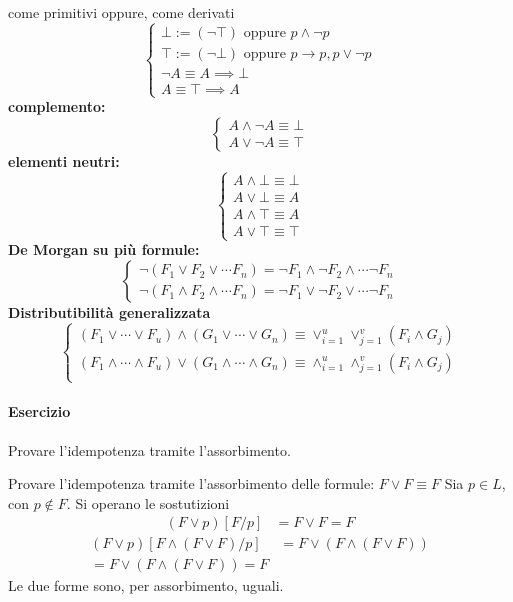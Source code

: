 come primitivi oppure, come derivati
$$
\begin{cases}
  \bot := (\neg \top) \text{ oppure } p \land \neg p \\
  \top := (\neg \bot) \text{ oppure } p \rightarrow p, p \lor \neg p \\
  \neg A \equiv A \implies \bot \\
  A \equiv \top \implies A 
\end{cases}
$$
\noindent 
\textbf{complemento:}
$$
\begin{cases}
  A \land \neg A \equiv \bot \\
  A \lor \neg A \equiv \top 
\end{cases}
$$
\noindent 
\textbf{elementi neutri:}
$$
\begin{cases}
  A \land \bot \equiv \bot \\
  A \lor \bot \equiv A \\
  A \land \top \equiv A \\
  A \lor \top  \equiv\top 
\end{cases}
$$
\noindent
\textbf{De Morgan su più formule:}
$$
\begin{cases}
  \neg (F_1 \lor F_2 \lor \cdots F_n) = \neg F_1 \land \neg F_2 \land \cdots \neg F_n\\
  \neg (F_1 \land F_2 \land \cdots F_n) = \neg F_1 \lor \neg F_2  \lor \cdots \neg F_n
\end{cases}
$$
\noindent 
\textbf{Distributibilità generalizzata}
$$
\begin{cases}
        (F_1 \lor \cdots \lor F_u) \land (G_1 \lor \cdots \lor G_n) \equiv \lor_{i = 1}^{u} \lor_{j = 1}^{v} (F_i \land G_j) \\
        (F_1 \land \cdots \land F_u) \lor (G_1 \land \cdots \land G_n) \equiv \land_{i = 1}^{u} \land_{j = 1}^{v} (F_i \land G_j) \\

\end{cases}
$$
\paragraph{Esercizio}
Provare l'idempotenza tramite l'assorbimento. 

Provare l'idempotenza tramite l'assorbimento delle formule: 
$F \lor F \equiv F$ Sia $p \in L $, con $p \notin F$. 
Si operano le sostutizioni 
\begin{align*} 
        (F\lor p) [ F/p] &= F \lor F = F 
\end{align*} 
\begin{align*} 
        (F\lor p) [ F\land(F \lor F)/p] &= F \lor (F \land (F \lor F)) \\
        = F \lor (F \land (F \lor F)) = F
\end{align*}
Le due forme sono, per assorbimento, uguali. 

